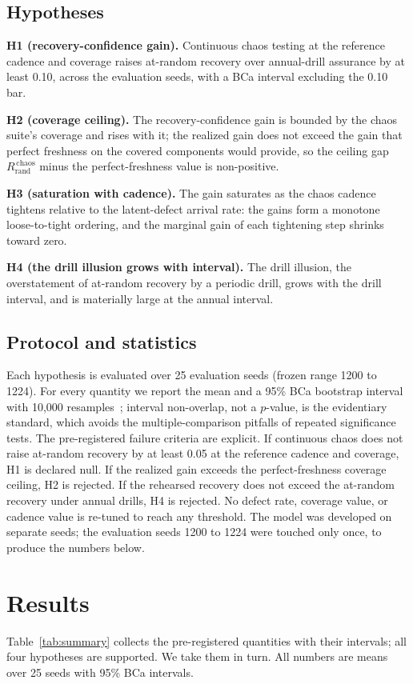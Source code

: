 \documentclass[journal]{IEEEtran}
\begin{document}
\subsection{Hypotheses}
\textbf{H1 (recovery-confidence gain).} Continuous chaos testing at the reference cadence and
coverage raises at-random recovery over annual-drill assurance by at least 0.10, across the
evaluation seeds, with a BCa interval excluding the 0.10 bar.

\textbf{H2 (coverage ceiling).} The recovery-confidence gain is bounded by the chaos suite's
coverage and rises with it; the realized gain does not exceed the gain that perfect freshness on the
covered components would provide, so the ceiling gap $R_{\mathrm{rand}}^{\,\mathrm{chaos}}$ minus the
perfect-freshness value is non-positive.

\textbf{H3 (saturation with cadence).} The gain saturates as the chaos cadence tightens relative to
the latent-defect arrival rate: the gains form a monotone loose-to-tight ordering, and the marginal
gain of each tightening step shrinks toward zero.

\textbf{H4 (the drill illusion grows with interval).} The drill illusion, the overstatement of
at-random recovery by a periodic drill, grows with the drill interval, and is materially large at
the annual interval.

\subsection{Protocol and statistics}
Each hypothesis is evaluated over 25 evaluation seeds (frozen range 1200 to 1224). For every quantity
we report the mean and a 95\% BCa bootstrap interval with 10{,}000
resamples~\cite{efron1987bca,efron1994introduction}; interval non-overlap, not a $p$-value, is the
evidentiary standard, which avoids the multiple-comparison pitfalls of repeated significance tests.
The pre-registered failure criteria are explicit. If continuous chaos does not raise at-random
recovery by at least 0.05 at the reference cadence and coverage, H1 is declared null. If the realized
gain exceeds the perfect-freshness coverage ceiling, H2 is rejected. If the rehearsed recovery does
not exceed the at-random recovery under annual drills, H4 is rejected. No defect rate, coverage value,
or cadence value is re-tuned to reach any threshold. The model was developed on separate seeds; the
evaluation seeds 1200 to 1224 were touched only once, to produce the numbers below.

\section{Results}
Table~\ref{tab:summary} collects the pre-registered quantities with their intervals; all four
hypotheses are supported. We take them in turn. All numbers are means over 25 seeds with 95\% BCa
intervals.
\end{document}
